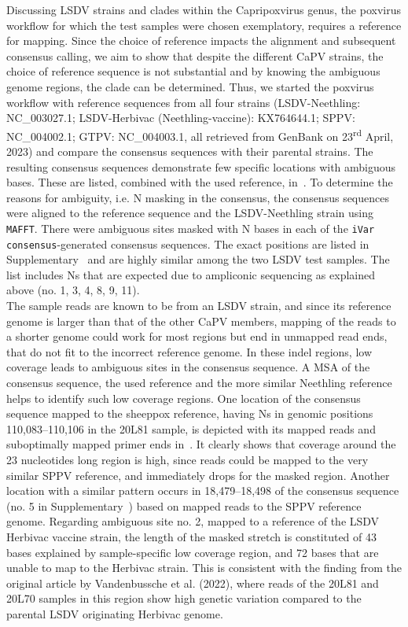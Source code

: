 Discussing \ac{LSDV} strains and clades within the Capripoxvirus genus, the poxvirus workflow for which the test samples were chosen exemplatory, requires a reference for mapping. Since the choice of reference impacts the alignment and subsequent consensus calling, we aim to show that despite the different \ac{CaPV} strains, the choice of reference sequence is not substantial and by knowing the ambiguous genome regions, the clade can be determined. Thus, we started the poxvirus workflow with reference sequences from all four strains (\ac{LSDV}-Neethling: NC\_003027.1; \ac{LSDV}-Herbivac (Neethling-vaccine): KX764644.1; SPPV: NC\_004002.1; \ac{GTPV}: NC\_004003.1, all retrieved from GenBank on 23\textsuperscript{rd} April, 2023) and compare the consensus sequences with their parental strains. The resulting consensus sequences demonstrate few specific locations with ambiguous bases. These are listed, combined with the used reference, in~. To determine the reasons for ambiguity, i.e. N masking in the consensus, the consensus sequences were aligned to the reference sequence and the \ac{LSDV}-Neethling strain using \texttt{\acs{MAFFT}}. There were ambiguous sites masked with N bases in each of the \texttt{iVar consensus}-generated consensus sequences. The exact positions are listed in Supplementary~ and are highly similar among the two \ac{LSDV} test samples. The list includes Ns that are expected due to ampliconic sequencing as explained above (no. 1, 3, 4, 8, 9, 11).\\
The sample reads are known to be from an \ac{LSDV} strain, and since its reference genome is larger than that of the other \acs{CaPV} members, mapping of the reads to a shorter genome could work for most regions but end in unmapped read ends, that do not fit to the incorrect reference genome. In these indel regions, low coverage leads to ambiguous sites in the consensus sequence. A \ac{MSA} of the consensus sequence, the used reference and the more similar Neethling reference helps to identify such low coverage regions. One location of the consensus sequence mapped to the sheeppox reference, having Ns in genomic positions 110,083--110,106 in the 20L81 sample, is depicted with its mapped reads and suboptimally mapped primer ends in~. It clearly shows that coverage around the 23 nucleotides long region is high, since reads could be mapped to the very similar \ac{SPPV} reference, and immediately drops for the masked region. Another location with a similar pattern occurs in 18,479--18,498 of the consensus sequence (no. 5 in Supplementary~) based on mapped reads to the \ac{SPPV} reference genome. Regarding ambiguous site no. 2, mapped to a reference of the \ac{LSDV} Herbivac vaccine strain, the length of the masked stretch is constituted of 43 bases explained by sample-specific low coverage region, and 72 bases that are unable to map to the Herbivac strain. This is consistent with the finding from the original article by Vandenbussche et al. (2022), where reads of the 20L81 and 20L70 samples in this region show high genetic variation compared to the parental \ac{LSDV} originating Herbivac genome.\\
